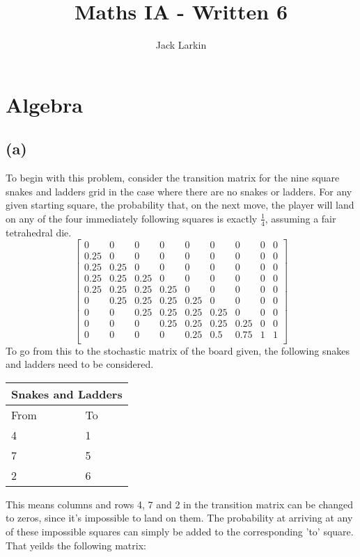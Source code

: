 \documentclass[11pt]{article}
\title{\textbf{Maths IA - Written 6}}
\date{}
\author{Jack Larkin}
\begin{document}
\maketitle

\section*{Algebra}
\subsection*{(a)}
To begin with this problem, consider the transition matrix for the nine square snakes and ladders grid in the case where there are no snakes or ladders. For any given starting square, the probability that, on the next move, the player will land on any of the four immediately following squares is exactly $\frac{1}{4}$, assuming a fair tetrahedral die.
$$\begin{bmatrix}
0 & 0 & 0 & 0 & 0 & 0 & 0 & 0 & 0\\
0.25 & 0 & 0 & 0 & 0 & 0 & 0 & 0 & 0\\
0.25 & 0.25 & 0 & 0 & 0 & 0 & 0 & 0 & 0\\
0.25 & 0.25 & 0.25 & 0 & 0 & 0 & 0 & 0 & 0\\
0.25 & 0.25 & 0.25 & 0.25 & 0 & 0 & 0 & 0 & 0\\
0 & 0.25 & 0.25 & 0.25 & 0.25 & 0 & 0 & 0 & 0\\
0 & 0 & 0.25 & 0.25 & 0.25 & 0.25 & 0 & 0 & 0\\
0 & 0 & 0 & 0.25 & 0.25 & 0.25 & 0.25 & 0 & 0\\
0 & 0 & 0 & 0 & 0.25 & 0.5 & 0.75 & 1 & 1\\
\end{bmatrix}$$
To go from this to the stochastic matrix of the board given, the following snakes and ladders need to be considered.\\
\begin{center}
\begin{tabular}{ |p{2cm}||p{2cm}| }
\hline
\multicolumn{2}{|c|}{Snakes and Ladders} \\
\hline
From & To\\
\hline
4 & 1\\
7 & 5\\
2 & 6\\
\hline
\end{tabular}
\end{center}
This means columns and rows 4, 7 and 2 in the transition matrix can be changed to zeros, since it's impossible to land on them. The probability at arriving at any of these impossible squares can simply be added to the corresponding 'to' square. That yeilds the following matrix:\\
\end{document}

